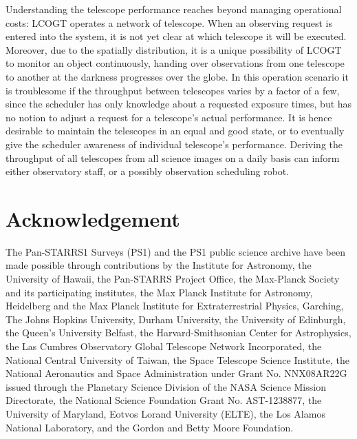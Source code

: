 \documentclass[]{spieman}
\begin{document}
Understanding the telescope performance reaches beyond managing operational costs: LCOGT operates a
network of telescope. When an observing request is entered into the system, it is not yet clear at
which telescope it will be executed. Moreover, due to the spatially distribution, it is a unique
possibility of LCOGT to monitor an object continuously, handing over observations from one telescope
to another at the darkness progresses over the globe. In this operation scenario it is troublesome
if the throughput between telescopes varies by a factor of a few, since the scheduler has only
knowledge about a requested exposure times, but has no notion to adjust a request for a telescope's
actual performance. It is hence desirable to maintain the telescopes in an equal {\it} and good
state, or to eventually give the scheduler awareness of individual telescope's performance. Deriving
the throughput of all telescopes from all science images on a daily basis can inform either
observatory staff, or a possibly observation scheduling robot.




\section{Acknowledgement}
The Pan-STARRS1 Surveys (PS1) and the PS1 public science archive have been made possible through
contributions by the Institute for Astronomy, the University of Hawaii, the Pan-STARRS Project
Office, the Max-Planck Society and its participating institutes, the Max Planck Institute for
Astronomy, Heidelberg and the Max Planck Institute for Extraterrestrial Physics, Garching, The Johns
Hopkins University, Durham University, the University of Edinburgh, the Queen's University Belfast,
the Harvard-Smithsonian Center for Astrophysics, the Las Cumbres Observatory Global Telescope
Network Incorporated, the National Central University of Taiwan, the Space Telescope Science
Institute, the National Aeronautics and Space Administration under Grant No. NNX08AR22G issued
through the Planetary Science Division of the NASA Science Mission Directorate, the National Science
Foundation Grant No. AST-1238877, the University of Maryland, Eotvos Lorand University (ELTE), the
Los Alamos National Laboratory, and the Gordon and Betty Moore Foundation.




\end{document}

